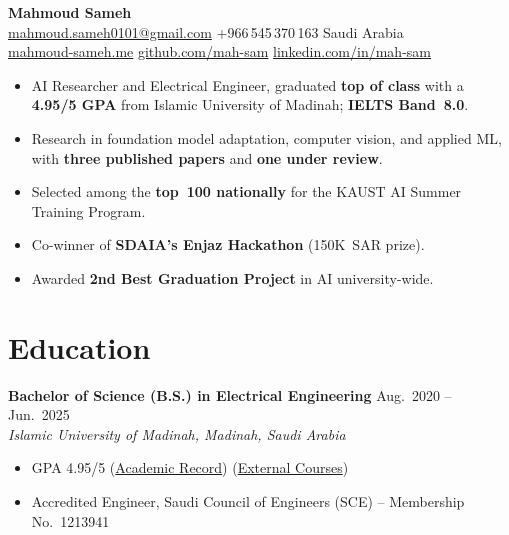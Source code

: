 \documentclass[a4paper,11pt]{article}
\newcommand{\cvsep}{\enspace\textbar\enspace}
\begin{document}
\begin{center}
    {\LARGE \textbf{Mahmoud Sameh}} \\[4pt]
    \href{mailto:mahmoud.sameh0101@gmail.com}{mahmoud.sameh0101@gmail.com}
    \cvsep +966\,545\,370\,163
    \cvsep Saudi Arabia \\[2pt]
    \href{https://mahmoud-sameh.me}{mahmoud-sameh.me}
    \cvsep \href{https://github.com/mah-sam}{github.com/mah-sam}
    \cvsep \href{https://linkedin.com/in/mah-sam}{linkedin.com/in/mah-sam}
\end{center}

\vspace{-4pt}
\begin{itemize}[leftmargin=1.5em, itemsep=2pt, parsep=0pt, topsep=2pt]
    \item AI Researcher and Electrical Engineer, graduated \textbf{top of class} with a \textbf{4.95/5 GPA} from Islamic University of Madinah; \textbf{IELTS Band~8.0}.
    \item Research in foundation model adaptation, computer vision, and applied ML, with \textbf{three published papers} and \textbf{one under review}.
    \item Selected among the \textbf{top~100 nationally} for the KAUST AI Summer Training Program.
    \item Co-winner of \textbf{SDAIA's Enjaz Hackathon} (150K~SAR prize).
    \item Awarded \textbf{2nd Best Graduation Project} in AI university-wide.
\end{itemize}

\section{Education}

\textbf{Bachelor of Science (B.S.) in Electrical Engineering} \hfill Aug.\ 2020 -- Jun.\ 2025 \\
\textit{Islamic University of Madinah, Madinah, Saudi Arabia}
\begin{itemize}
    \item GPA 4.95/5 (\href{https://github.com/mah-sam/my_cv/blob/main/Mahmoud_Sameh_Transcript.pdf?raw=true}{Academic Record}) (\href{https://github.com/mah-sam/my_cv/blob/main/Mahmoud_Sameh_Certificates.pdf?raw=true}{External Courses})
    \item Accredited Engineer, Saudi Council of Engineers (SCE) -- Membership No.\ 1213941
\end{itemize}
\end{document}
